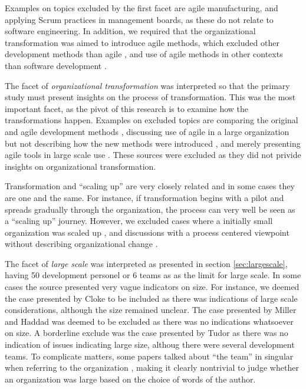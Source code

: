 \documentclass[preprint,authoryear,12pt]{elsarticle}
\begin{document}
Examples on topics excluded by the first facet are agile manufacturing, and
applying Scrum practices in management boards, as these do not relate to
software engineering. In addition, we required that the organizational
transformation was aimed to introduce agile methods, which excluded other
development methods than agile \cite{Sagesser2013}, and use of agile
methods in other contexts than software development \cite{Hodgkins2007}.

The facet of \emph{organizational transformation} was interpreted so that the
primary study must present insights on the process of transformation. This
was the most important facet, as the pivot of this research is to examine
how the transformations happen. Examples on excluded topics are comparing the
original and agile development methods \cite{Petersen2010}, discussing use of
agile in a large organization but not describing how the new methods were
introduced \cite{Mishra2011}, and merely presenting agile tools in large scale
use \cite{Kim2012}. These sources were excluded as they did not privide insights
on organizational transformation.

Transformation and ``scaling up'' are very closely related and in some cases
they are one and the same. For instance, if transformation begins with a pilot
and spreads gradually through the organization, the process can very well be
seen as a ``scaling up'' journey. However, we excluded cases where a initially
small organization was scaled up \cite{Maranzato2012}, and discussions with a
process centered viewpoint without describing organizational change
\cite{Lyon2008}.

The facet of \emph{large scale} was interpreted as presented in section
\ref{sec:largescale}, having 50 development personel or 6 teams as as the limit
for large scale. In some cases the source presented very vague indicators on
size. For instance, we deemed the case presented by Cloke \cite{Cloke2007} to be
included as there was indications of large scale considerations, although the
size remained unclear. The case presented by Miller and Haddad \cite{Miller2012}
was deemed to be excluded as there was no indications whatsoever on size. A
borderline exclude was the case presented by Tudor \cite{Tudor2006} as there was
no indication of issues indicating large size, althoug there were several
development teams.
To complicate matters, some papers talked about ``the team'' in singular when
referring to the organization \cite{Hodgkins2007}, making it clearly nontrivial
to judge whether an organization was large based on the choice of words of the
author.
\end{document}

